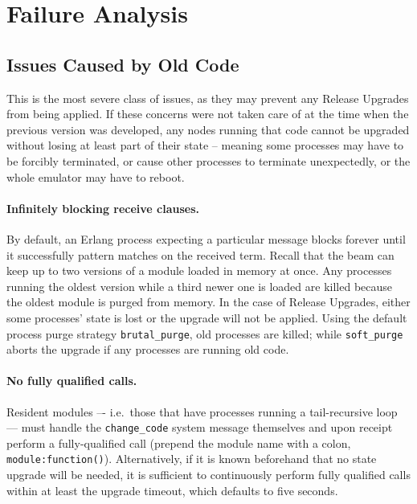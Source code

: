 \cleardoublepage
\section{Failure Analysis}

\subsection{Issues Caused by Old Code}

This is the most severe class of issues, as they may prevent any Release Upgrades from being applied. If these concerns were not taken care of at the time when the previous version was developed, any nodes running that code cannot be upgraded without losing at least part of their state -- meaning some processes may have to be forcibly terminated, or cause other processes to terminate unexpectedly, or the whole emulator may have to reboot.

\paragraph{Infinitely blocking receive clauses.}
By default, an Erlang process expecting a particular message blocks forever until it successfully pattern matches on the received term. Recall that the \acrshort{beam} can keep up to two versions of a module loaded in memory at once. Any processes running the oldest version while a third newer one is loaded are killed because the oldest module is purged from memory. In the case of Release Upgrades, either some processes' state is lost or the upgrade will not be applied. Using the default process purge strategy \lstinline|brutal_purge|, old processes are killed; while \lstinline|soft_purge| aborts the upgrade if any processes are running old code.

\paragraph{No fully qualified calls.}
Resident modules –- i.e.~those that have processes running a tail-recursive loop –– must handle the \lstinline|change_code| system message themselves and upon receipt perform a fully-qualified call (prepend the module name with a colon, \lstinline|module:function()|). Alternatively, if it is known beforehand that no state upgrade will be needed, it is sufficient to continuously perform fully qualified calls within at least the upgrade timeout, which defaults to five seconds.


